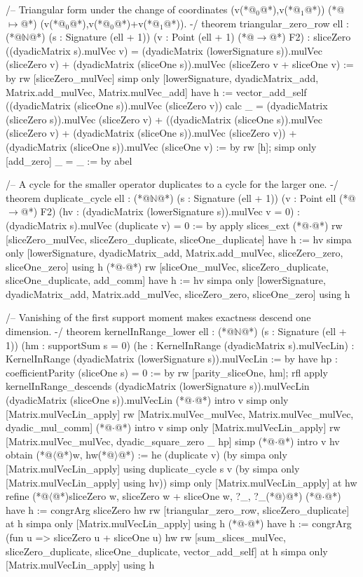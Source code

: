 /-- Triangular form under the change of coordinates (v(*@${}_0$@*),v(*@${}_1$@*)) (*@$\mapsto$@*) (v(*@${}_0$@*),v(*@${}_0$@*)+v(*@${}_1$@*)). -/
theorem triangular_zero_row {ell : (*@$\mathbb{N}$@*)} (s : Signature (ell + 1)) (v : Point (ell + 1) (*@$\to$@*) F2) :
    sliceZero ((dyadicMatrix s).mulVec v) =
      (dyadicMatrix (lowerSignature s)).mulVec (sliceZero v) +
      (dyadicMatrix (sliceOne s)).mulVec (sliceZero v + sliceOne v) := by
  rw [sliceZero_mulVec]
  simp only [lowerSignature, dyadicMatrix_add, Matrix.add_mulVec, Matrix.mulVec_add]
  have h := vector_add_self ((dyadicMatrix (sliceOne s)).mulVec (sliceZero v))
  calc
    _ = (dyadicMatrix (sliceZero s)).mulVec (sliceZero v) +
        ((dyadicMatrix (sliceOne s)).mulVec (sliceZero v) +
         (dyadicMatrix (sliceOne s)).mulVec (sliceZero v)) +
        (dyadicMatrix (sliceOne s)).mulVec (sliceOne v) := by rw [h]; simp only [add_zero]
    _ = _ := by abel

/-- A cycle for the smaller operator duplicates to a cycle for the larger one. -/
theorem duplicate_cycle {ell : (*@$\mathbb{N}$@*)} (s : Signature (ell + 1)) (v : Point ell (*@$\to$@*) F2)
    (hv : (dyadicMatrix (lowerSignature s)).mulVec v = 0) :
    (dyadicMatrix s).mulVec (duplicate v) = 0 := by
  apply slices_ext
  (*@$\cdot$@*) rw [sliceZero_mulVec, sliceZero_duplicate, sliceOne_duplicate]
    have h := hv
    simpa only [lowerSignature, dyadicMatrix_add, Matrix.add_mulVec, sliceZero_zero, sliceOne_zero] using h
  (*@$\cdot$@*) rw [sliceOne_mulVec, sliceZero_duplicate, sliceOne_duplicate, add_comm]
    have h := hv
    simpa only [lowerSignature, dyadicMatrix_add, Matrix.add_mulVec, sliceZero_zero, sliceOne_zero] using h

/-- Vanishing of the first support moment makes exactness descend one dimension. -/
theorem kernelInRange_lower {ell : (*@$\mathbb{N}$@*)} (s : Signature (ell + 1))
    (hm : supportSum s = 0) (he : KernelInRange (dyadicMatrix s).mulVecLin) :
    KernelInRange (dyadicMatrix (lowerSignature s)).mulVecLin := by
  have hp : coefficientParity (sliceOne s) = 0 := by rw [parity_sliceOne, hm]; rfl
  apply kernelInRange_descends (dyadicMatrix (lowerSignature s)).mulVecLin
    (dyadicMatrix (sliceOne s)).mulVecLin
  (*@$\cdot$@*) intro v
    simp only [Matrix.mulVecLin_apply]
    rw [Matrix.mulVec_mulVec, Matrix.mulVec_mulVec, dyadic_mul_comm]
  (*@$\cdot$@*) intro v
    simp only [Matrix.mulVecLin_apply]
    rw [Matrix.mulVec_mulVec, dyadic_square_zero _ hp]
    simp
  (*@$\cdot$@*) intro v hv
    obtain (*@$\langle$@*)w, hw(*@$\rangle$@*) := he (duplicate v) (by
      simpa only [Matrix.mulVecLin_apply] using duplicate_cycle s v (by
        simpa only [Matrix.mulVecLin_apply] using hv))
    simp only [Matrix.mulVecLin_apply] at hw
    refine (*@$\langle$@*)sliceZero w, sliceZero w + sliceOne w, ?_, ?_(*@$\rangle$@*)
    (*@$\cdot$@*) have h := congrArg sliceZero hw
      rw [triangular_zero_row, sliceZero_duplicate] at h
      simpa only [Matrix.mulVecLin_apply] using h
    (*@$\cdot$@*) have h := congrArg (fun u => sliceZero u + sliceOne u) hw
      rw [sum_slices_mulVec, sliceZero_duplicate, sliceOne_duplicate, vector_add_self] at h
      simpa only [Matrix.mulVecLin_apply] using h

